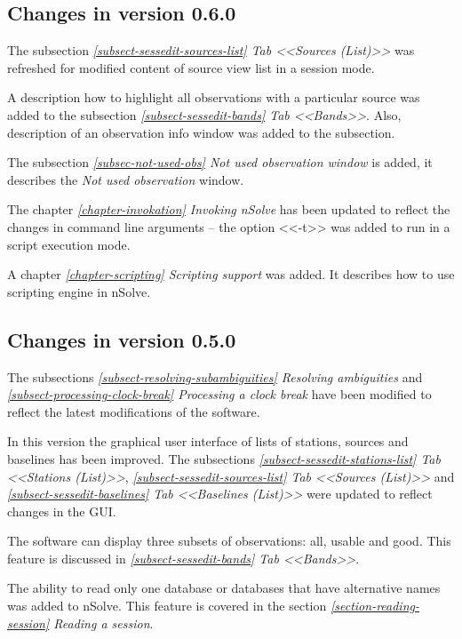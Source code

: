 \documentclass [10pt,letterpaper]{report}
\newcommand{\nuSolve}{\greektext n\latintext Solve}
\begin{document}
{\subsection{Changes in version 0.6.0}
The subsection
\emph{\ref{subsect-sessedit-sources-list} Tab <<Sources (List)>>}
was refreshed for modified content of source view list in a session mode.

A description how to highlight all observations with a particular source was added
to the subsection
\emph{\ref{subsect-sessedit-bands} Tab <<Bands>>}.
Also, description of an observation info window was added to the subsection.

The subsection
\emph{\ref{subsec-not-used-obs} Not used observation window}
is added, it describes the {\sl Not used observation} window.

The chapter \emph{\ref{chapter-invokation} Invoking \nuSolve{}} has been updated
to reflect the changes in command line arguments -- the option <<-t>> was added to
run in a script execution mode.

A chapter \emph{\ref{chapter-scripting} Scripting support} was added. It describes
how to use scripting engine in \nuSolve{}.



\subsection{Changes in version 0.5.0}
The subsections
\emph{\ref{subsect-resolving-subambiguities} Resolving ambiguities} and
\emph{\ref{subsect-processing-clock-break} Processing a clock break}
have been modified to reflect the latest modifications of the software.

In this version the graphical user interface of lists of stations, sources
and baselines has been improved. The subsections
\emph{\ref{subsect-sessedit-stations-list} Tab <<Stations (List)>>},
\emph{\ref{subsect-sessedit-sources-list} Tab <<Sources (List)>>} and
\emph{\ref{subsect-sessedit-baselines} Tab <<Baselines (List)>>}
were updated to reflect changes in the GUI.


The software can display three subsets of observations: all, usable and good.
This feature is discussed in \emph{\ref{subsect-sessedit-bands} Tab <<Bands>>}.

The ability to read only one database or databases that have alternative names
was added to \nuSolve{}. This feature is covered in the section
\emph{\ref{section-reading-session} Reading a session}.


}
\end{document}
